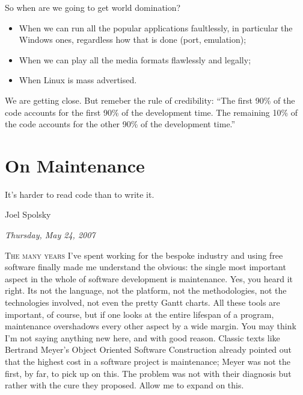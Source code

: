 \documentclass{book}
\begin{document}
So when are we going to get world domination?

\begin{itemize}
\item When we can run all the popular applications faultlessly, in
  particular the Windows ones, regardless how that is done (port,
  emulation);
\item When we can play all the media formats flawlessly and legally;
\item When Linux is mass advertised.
\end{itemize}

We are getting close. But remeber the rule of credibility: ``The first
90\% of the code accounts for the first 90\% of the development
time. The remaining 10\% of the code accounts for the other 90\% of
the development time.''

\chapter{On Maintenance}

\epigraph{It's harder to read code than to write it.}{Joel Spolsky}

\begin{flushright}
  \emph{Thursday, May 24, 2007}
\end{flushright}

\lettrine{T}{he many years} I've spent working for the bespoke
industry and using free software finally made me understand the
obvious: the single most important aspect in the whole of software
development is maintenance. Yes, you heard it right. Its not the
language, not the platform, not the methodologies, not the
technologies involved, not even the pretty Gantt charts. All these
tools are important, of course, but if one looks at the entire
lifespan of a program, maintenance overshadows every other aspect by a
wide margin. You may think I'm not saying anything new here, and with
good reason. Classic texts like Bertrand Meyer's Object Oriented
Software Construction already pointed out that the highest cost in a
software project is maintenance; Meyer was not the first, by far, to
pick up on this. The problem was not with their diagnosis but rather
with the cure they proposed. Allow me to expand on this.
\end{document}
